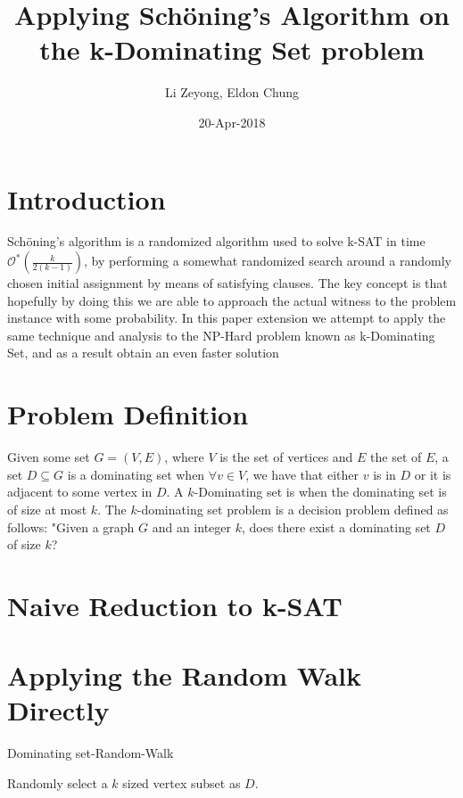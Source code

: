 \documentclass{article}
\title{Applying Sch\"{o}ning's Algorithm on the k-Dominating Set problem}
\author{Li Zeyong, Eldon Chung}
\date{20-Apr-2018}
\begin{document}
\maketitle

\section{Introduction}
	Sch\"{o}ning's algorithm is a randomized algorithm used to solve k-SAT in time $\mathcal{O}^*(\frac{k}{2(k-1)})$, by performing a somewhat randomized search around a randomly chosen initial assignment by means of satisfying clauses. The key concept is that hopefully by doing this we are able to approach the actual witness to the problem instance with some probability. In this paper extension we attempt to apply the same technique and analysis to the NP-Hard problem known as k-Dominating Set, and as a result obtain an even faster solution \par 
	
\section{Problem Definition}
	Given some set $G = (V, E)$, where $V$ is the set of vertices and $E$ the set of $E$, a set $D \subseteq G$ is a dominating set when $\forall v \in V$, we have that either $v$ is in $D$ or it is adjacent to some vertex in $D$. A $k$-Dominating set is when the dominating set is of size at most $k$. The $k$-dominating set problem is a decision problem defined as follows: "Given a graph $G$ and an integer $k$, does there exist a dominating set $D$ of size $k$?\par
	
\section{Naive Reduction to k-SAT}	
	
\section{Applying the Random Walk Directly}
	\begin{algorithm}[H]
	\caption{Dominating set-Random-Walk}
	\DontPrintSemicolon
	\BlankLine
	Randomly select a $k$ sized vertex subset as $D$.\\
	\hspace{7em}
\end{algorithm}
	
\end{document}
